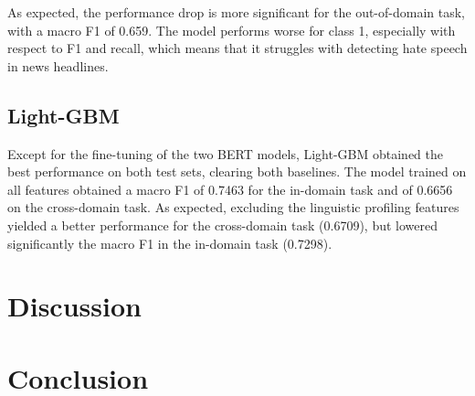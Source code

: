 \documentclass[a4paper, 9pt, twocolumn, DIV=calc]{scrartcl}
\begin{document}
As expected, the performance drop is more significant for the out-of-domain task, with a macro F1 of 0.659. The model performs worse for class 1, especially with respect to F1 and recall, which means that it struggles with detecting hate speech in news headlines.

\subsection{Light-GBM}
Except for the fine-tuning of the two BERT models, Light-GBM obtained the best performance on both test sets, clearing both baselines.
The model trained on all features obtained a macro F1 of 0.7463 for the in-domain task and of 0.6656 on the cross-domain task.
As expected, excluding the linguistic profiling features yielded a better performance for the cross-domain task (0.6709), but lowered significantly the macro F1 in the in-domain task (0.7298).


\section{Discussion}

\section{Conclusion}

\printbibliography{}
\end{document}
